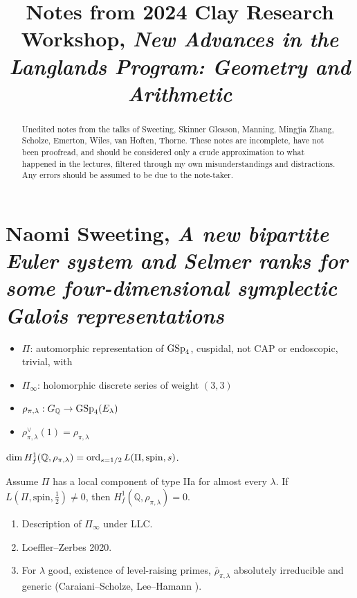 \documentclass[reqno]{amsart} 
\begin{document}
\title{Notes from 2024 Clay Research Workshop, \emph{New Advances in the Langlands Program: Geometry and Arithmetic}}

\begin{abstract}
  Unedited notes from the talks of Sweeting, Skinner Gleason, Manning, Mingjia Zhang, Scholze, Emerton, Wiles, van Hoften, Thorne.  These notes are incomplete, have not been proofread, and should be considered only a crude approximation to what happened in the lectures, filtered through my own misunderstandings and distractions.  Any errors should be assumed to be due to the note-taker.
\end{abstract}

\maketitle

\tableofcontents


\part{Naomi Sweeting, \emph{A new bipartite Euler system and Selmer ranks for some four-dimensional symplectic Galois representations}}

\begin{itemize}
\item $\Pi$: automorphic representation of $\operatorname{GSp}_{4}$, cuspidal, not CAP or endoscopic, trivial, with 
\item $\Pi_\infty$: holomorphic discrete series of weight $(3,3)$
\item $\rho_{\pi, \lambda} : G_{\mathbb{Q}} \rightarrow \operatorname{GSp}_4(E_\lambda)$
\item $\rho_{\pi, \lambda}^\vee(1) = \rho_{\pi, \lambda}$
\end{itemize}
\begin{conjecture}
  $\dim H_f^1(\mathbb{Q}, \rho_{\pi, \lambda}) = \operatorname{ord}_{s = 1/2} L(\Pi, \mathrm{spin}, s)$.
\end{conjecture}
\begin{theorem}[S.,\ TBD]\label{theorem:cnpoolw6ih}
  Assume $\Pi$ has a local component of type IIa for almost every $\lambda$.  If $L(\Pi, \mathrm{spin}, \tfrac{1}{2}) \neq 0$, then $H_f^1(\mathbb{Q}, \rho_{\pi, \lambda}) = 0$.
\end{theorem}

\begin{remark}
  \begin{enumerate}
  \item Description of $\Pi_\infty$ under LLC.
  \item Loeffler--Zerbes 2020.
  \item For $\lambda$ good, existence of level-raising primes, $\bar{\rho}_{\pi, \lambda}$ absolutely irreducible and generic (Caraiani--Scholze, Lee--Hamann \cite{2023arXiv2309.08705}).
  \end{enumerate}
\end{remark}
\end{document}
